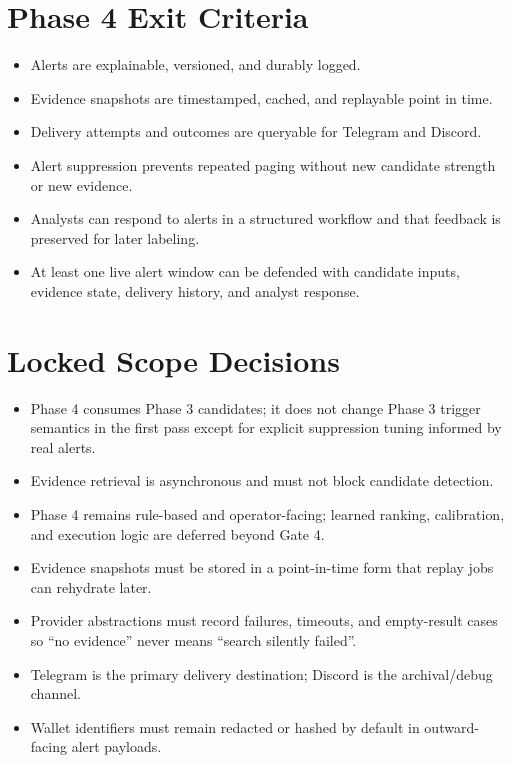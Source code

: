 \documentclass{article}
\begin{document}
\section*{Phase 4 Exit Criteria}
\begin{itemize}
\item Alerts are explainable, versioned, and durably logged.
\item Evidence snapshots are timestamped, cached, and replayable point in time.
\item Delivery attempts and outcomes are queryable for Telegram and Discord.
\item Alert suppression prevents repeated paging without new candidate strength or new evidence.
\item Analysts can respond to alerts in a structured workflow and that feedback is preserved for later labeling.
\item At least one live alert window can be defended with candidate inputs, evidence state, delivery history, and analyst response.
\end{itemize}

\section*{Locked Scope Decisions}
\begin{itemize}
\item Phase 4 consumes Phase 3 candidates; it does not change Phase 3 trigger semantics in the first pass except for explicit suppression tuning informed by real alerts.
\item Evidence retrieval is asynchronous and must not block candidate detection.
\item Phase 4 remains rule-based and operator-facing; learned ranking, calibration, and execution logic are deferred beyond Gate 4.
\item Evidence snapshots must be stored in a point-in-time form that replay jobs can rehydrate later.
\item Provider abstractions must record failures, timeouts, and empty-result cases so ``no evidence'' never means ``search silently failed''.
\item Telegram is the primary delivery destination; Discord is the archival/debug channel.
\item Wallet identifiers must remain redacted or hashed by default in outward-facing alert payloads.
\end{itemize}
\end{document}
